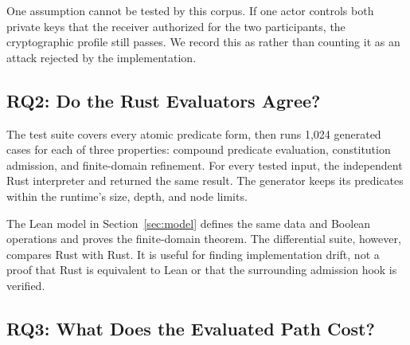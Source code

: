One assumption cannot be tested by this corpus. If one actor controls both
private keys that the receiver authorized for the two participants, the
cryptographic profile still passes. We record this as 
rather than counting it as an attack rejected by the implementation.

\subsection{RQ2: Do the Rust Evaluators Agree?}

The test suite covers every atomic predicate form, then runs 1,024 generated
cases for each of three properties: compound predicate evaluation,
constitution admission, and finite-domain refinement. For every tested input,
the independent Rust interpreter and  returned the
same result. The generator keeps its predicates within the runtime's size,
depth, and node limits.

The Lean model in Section~\ref{sec:model} defines the same data and Boolean
operations and proves the finite-domain theorem. The differential suite,
however, compares Rust with Rust. It is useful for finding implementation
drift, not a proof that Rust is equivalent to Lean or that the surrounding
admission hook is verified.

\subsection{RQ3: What Does the Evaluated Path Cost?}

